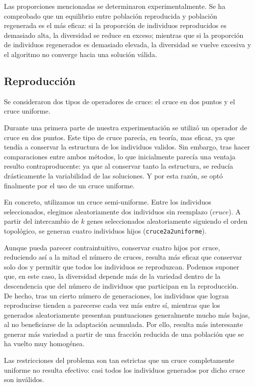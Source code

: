 \documentclass[12pt,a4paper]{report}
\begin{document}
Las proporciones mencionadas se determinaron experimentalmente. Se ha comprobado que un equilibrio entre población reproducida y población regenerada es el más eficaz: si la proporción de individuos reproducidos es demasiado alta, la diversidad se reduce en exceso; mientras que si la proporción de individuos regenerados es demasiado elevada, la diversidad se vuelve excesiva y el algoritmo no converge hacia una solución válida.

\subsection{Reproducción}
Se consideraron dos tipos de operadores de cruce: el cruce en dos puntos y el cruce uniforme.

Durante una primera parte de nuestra experimentación se utilizó un operador de cruce en dos puntos. Este tipo de cruce parecía, en teoría, mas eficaz, ya que tendía a conservar la estructura de los individuos validos. Sin embargo, tras hacer comparaciones entre ambos métodos, lo que inicialmente parecía una ventaja resulto contraproducente: ya que al conservar tanto la estructura, se reducía drásticamente la variabilidad de las soluciones. Y por esta razón, se optó finalmente por el uso de un cruce uniforme.

En concreto, utilizamos un cruce semi-uniforme. Entre los individuos seleccionados, elegimos aleatoriamente dos individuos sin reemplazo ($cruce$). A partir del intercambio de $k$ genes seleccionados aleatoriamente siguiendo el orden topológico, se generan cuatro individuos hijos (\texttt{cruce2a2uniforme}).

Aunque pueda parecer contraintuitivo, conservar cuatro hijos por cruce, reduciendo así a la mitad el número de cruces, resulta más eficaz que conservar solo dos y permitir que todos los individuos se reproduzcan. Podemos suponer que, en este caso, la diversidad depende más de la variedad dentro de la descendencia que del número de individuos que participan en la reproducción.\\
De hecho, tras un cierto número de generaciones, los individuos que logran reproducirse tienden a parecerse cada vez más entre sí, mientras que los generados aleatoriamente presentan puntuaciones generalmente mucho más bajas, al no beneficiarse de la adaptación acumulada. Por ello, resulta más interesante generar más variedad a partir de una fracción reducida de una población que se ha vuelto muy homogénea.

Las restricciones del problema son tan estrictas que un cruce completamente uniforme no resulta efectivo: casi todos los individuos generados por dicho cruce son inválidos.\\
\end{document}
